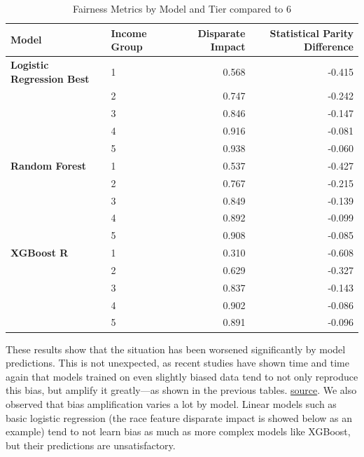 \documentclass{article}
\begin{document}
\vspace{1em}

\begin{table}[htbp]
\centering
\caption{Fairness Metrics by Model and Tier compared to 6}
\begin{tabular}{llrr}
\toprule
\textbf{Model} & \textbf{Income Group} & \textbf{Disparate Impact} & \textbf{Statistical Parity Difference} \\
\midrule
\textbf{Logistic Regression Best} & 1 & 0.568 & -0.415 \\
                                   & 2 & 0.747 & -0.242 \\
                                   & 3 & 0.846 & -0.147 \\
                                   & 4 & 0.916 & -0.081 \\
                                   & 5 & 0.938 & -0.060 \\
\midrule
\textbf{Random Forest}             & 1 & 0.537 & -0.427 \\
                                   & 2 & 0.767 & -0.215 \\
                                   & 3 & 0.849 & -0.139 \\
                                   & 4 & 0.892 & -0.099 \\
                                   & 5 & 0.908 & -0.085 \\
\midrule
\textbf{XGBoost R}                & 1 & 0.310 & -0.608 \\
                                   & 2 & 0.629 & -0.327 \\
                                   & 3 & 0.837 & -0.143 \\
                                   & 4 & 0.902 & -0.086 \\
                                   & 5 & 0.891 & -0.096 \\
\bottomrule
\end{tabular}
\end{table}


\vspace{1em}

These results show that the situation has been worsened significantly by model predictions. This is not unexpected, as recent studies have shown time and time again that models trained on even slightly biased data tend to not only reproduce this bias, but amplify it greatly—as shown in the previous tables. \href{https://arxiv.org/pdf/2201.11706}{source}.
We also observed that bias amplification varies a lot by model. Linear models such as basic logistic regression (the race feature disparate impact is showed below as an example) tend to not learn bias as much as more complex models like XGBoost, but their predictions are unsatisfactory. 
\end{document}
